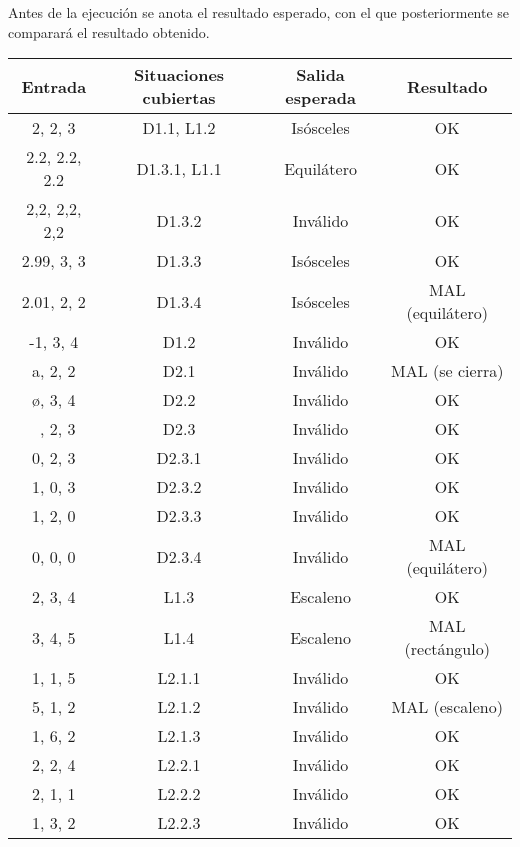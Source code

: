 Antes de la ejecución se anota el resultado esperado, con el que posteriormente
se comparará el resultado obtenido.

\begin{table}[ht]
	\centering
	\begin{tabular}{|c|c|c|c|}
		\hline
		\textbf{Entrada} & \textbf{Situaciones cubiertas} & \textbf{Salida esperada} & \textbf{Resultado} \\
		\hline
		2, 2, 3 & D1.1, L1.2 & Isósceles & \cellcolor{green!25} OK \\
		2.2, 2.2, 2.2 & D1.3.1, L1.1 & Equilátero & \cellcolor{green!25} OK \\
		2,2, 2,2, 2,2 & D1.3.2 & Inválido & \cellcolor{green!25} OK \\
		2.99, 3, 3 & D1.3.3 & Isósceles & \cellcolor{green!25} OK \\
		2.01, 2, 2 & D1.3.4 & Isósceles & \cellcolor{red!25} MAL (equilátero) \\
		-1, 3, 4 & D1.2 & Inválido & \cellcolor{green!25} OK \\
		a, 2, 2 & D2.1 & Inválido & \cellcolor{red!25} MAL (se cierra) \\
		ø, 3, 4 & D2.2 & Inválido & \cellcolor{green!25} OK \\
		~, 2, 3 & D2.3 & Inválido & \cellcolor{green!25} OK \\
		0, 2, 3 & D2.3.1 & Inválido & \cellcolor{green!25} OK \\
		1, 0, 3 & D2.3.2 & Inválido & \cellcolor{green!25} OK \\
		1, 2, 0 & D2.3.3 & Inválido & \cellcolor{green!25} OK \\
		0, 0, 0 & D2.3.4 & Inválido & \cellcolor{red!25} MAL (equilátero) \\
		2, 3, 4 & L1.3 & Escaleno & \cellcolor{green!25} OK \\
		3, 4, 5 & L1.4 & Escaleno & \cellcolor{red!25} MAL (rectángulo) \\
		1, 1, 5 & L2.1.1 & Inválido & \cellcolor{green!25} OK \\
		5, 1, 2 & L2.1.2 & Inválido & \cellcolor{red!25} MAL (escaleno) \\
		1, 6, 2 & L2.1.3 & Inválido & \cellcolor{green!25} OK \\
		2, 2, 4 & L2.2.1 & Inválido & \cellcolor{green!25} OK \\
		2, 1, 1 & L2.2.2 & Inválido & \cellcolor{green!25} OK \\
		1, 3, 2 & L2.2.3 & Inválido & \cellcolor{green!25} OK \\

\end{tabular}
\end{table}
